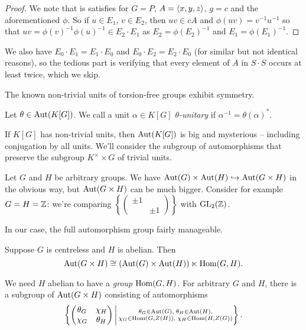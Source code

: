 \begin{proof}
    We note that  is satisfies for $G = P$, $A = \langle x, y, z \rangle$, $g = c$ and the aforementioned $\phi$.
    So if $u \in E_1$, $v \in E_2$, then $uv \in cA$ and $\phi(uv) = v^{-1} u^{-1}$ so that $uv = \phi(v)^{-1} \phi(u)^{-1} \in E_2 \cdot E_1$ as $E_2 = \phi(E_2)^{-1}$ and $E_1 = \phi(E_1)^{-1}$.
\end{proof}

We also have $E_0 \cdot E_1 = E_1 \cdot E_0$ and $E_0 \cdot E_2 = E_2 \cdot E_0$ (for similar but not identical reasons), so the tedious part is verifying that every element of $A$ in $S \cdot S$ occurs at least twice, which we skip.

The known non-trivial units of torsion-free groups exhibit symmetry.
\begin{definition}
    Let $\theta \in \mathrm{Aut}(K[G])$.
    We call a unit $\alpha \in K[G]$ \emph{$\theta$-unitary} if $\alpha^{-1} = \theta(\alpha)^*$.
\end{definition}
If $K[G]$ has non-trivial units, then $\mathrm{Aut}(K[G])$ is big and mysterious -- including conjugation by all units.
We'll consider the subgroup of automorphisms that preserve the subgroup $K^\times \times G$ of trivial units.

Let $G$ and $H$ be arbitrary groups.
We have $\mathrm{Aut}(G) \times \mathrm{Aut}(H) \hookrightarrow \mathrm{Aut}(G \times H)$ in the obvious way, but $\mathrm{Aut}(G \times H)$ can be much bigger.
Consider for example $G = H = \mathbb{Z}$: we're comparing $\left\{\left(\begin{smallmatrix} \pm 1 & \\ & \pm 1 \end{smallmatrix}\right)\right\}$ with $\mathrm{GL}_2(\mathbb{Z})$.

In our case, the full automorphism group fairly manageable.
\begin{proposition}
    \label{proposition:aut_of_centreless_times_abelian}
    Suppose $G$ is centreless and $H$ is abelian.
    Then \[
        \mathrm{Aut}(G \times H) \cong (\mathrm{Aut}(G) \times \mathrm{Aut}(H)) \ltimes \mathrm{Hom}(G, H).
    \]
\end{proposition}

\begin{remark}
    We need $H$ abelian to have a \emph{group} $\mathrm{Hom}(G, H)$.
    For arbitrary $G$ and $H$, there is a subgroup of $\mathrm{Aut}(G \times H)$ consisting of automorphisms \[
        \left\{ 
            \begin{pmatrix}
                \theta_G & \chi_H \\
                \chi_G & \theta_H
            \end{pmatrix}
         \,\middle|\, 
            \substack{
                \theta_G \in \mathrm{Aut}(G), \; \theta_H \in \mathrm{Aut}(H), \\
                \chi_G \in \mathrm{Hom}(G, Z(H)), \; \chi_H \in \mathrm{Hom}(H, Z(G))
            }
         \right\}.
    \]
\end{remark}

